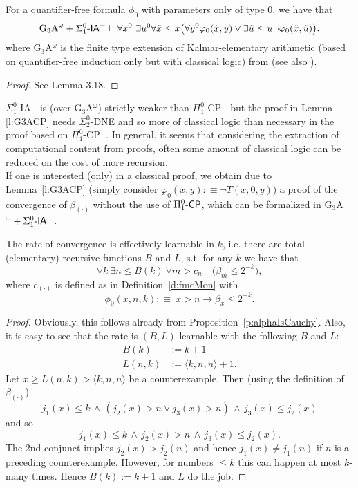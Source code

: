 \begin{lemma}\label{l:G3ACP} 
For a quantifier-free formula $\phi_0$ with parameters only of type $0$, we have that
\[
\mbox{\rm G$_3$A}^\omega + 
\Sigma^0_1\textsf{\upshape -}\textsf{\upshape IA}^- \vdash 
\forall x^0\ \exists u^0 
\forall\tilde x\leq x \big(  
\forall y^0 \varphi_0(\tilde x,y)
\vee\exists\tilde u\leq u\neg\varphi_0(\tilde x,\tilde u) \big).
\]
where {\rm G$_3$A$^{\omega}$} is the finite type extension of Kalmar-elementary 
arithmetic (based on quantifier-free induction only but with classical logic) 
from 
{\rm \cite{Kohlenbach(lowrate)}} (see also {\rm \cite{Kohlenbach08}}).
\end{lemma}
\begin{proof}
See \cite{Kohlenbach08} Lemma 3.18.
\end{proof}

\begin{rmk}
$\Sigma^0_1$-IA$^-$ is (over G$_3$A$^{\omega}$) strictly weaker than 
$\Pi^0_1$-CP$^-$ but the proof in Lemma \ref{l:G3ACP} needs $\Sigma^0_2$-DNE 
and so more of classical logic than necessary in the proof based on 
$\Pi^0_1$-CP$^-$.
In general, it seems that considering the extraction of computational content 
from proofs, often some amount of classical logic can be reduced on the cost of more recursion.\\
If one is interested (only) in a classical proof, we obtain due to Lemma~\ref{l:G3ACP}
(simply consider $\varphi_0(x,y):\equiv \neg T(x,0,y)$) a proof of the 
convergence of $\beta_{(\cdot)}$ 
without the use of $\Pi^0_1\textsf{\upshape -}\textsf{\upshape CP}$, which can be formalized in G$_3$A$^{\omega}+\Sigma^0_1\textsf{\upshape -}\textsf{\upshape IA}^-$.
\end{rmk}

\begin{prop}\label{p:alphaIsLearnable}
The rate of convergence is effectively learnable in $k$, i.e.
there are total (elementary) 
recursive functions $B$ and $L$, s.t. for any $k$ we have that
\[ \forall k\ \exists n\leq B(k)\ \forall m > c_n\quad \big(\beta_m\leq 2^{-k}\big),\]
where $c_{(\cdot)}$ is defined as in Definition~\ref{d:fmcMon} with
\[
\phi_0(x,n,k):\equiv\ x> n\rightarrow \beta_x\le 2^{-k}.
\]
\end{prop}
\begin{proof}
Obviously, this follows already from Proposition~\ref{p:alphaIsCauchy}. Also, it is easy to see that the 
rate is $(B,L)$-learnable with the following $B$ and $L$:
\begin{align*}
B(k)&:=k+1  \\
L(n,k)&:= \langle k,n,n \rangle+1.
\end{align*}
Let $x\ge L(n,k)>\langle k,n,n\rangle$ be a counterexample. Then (using 
the definition of $\beta_{(\cdot)}$)  
\[ j_1(x)\le k\,\wedge\,(j_2(x)>n\vee j_3(x)>n)\,\wedge \,j_3(x)\le j_2(x) \] 
and so 
\[ j_1(x)\le k\,\wedge\,j_2(x)>n\,\wedge\,j_3(x)\le j_2(x). \]
The 2nd conjunct implies $j_2(x)>j_2(n)$ and hence $j_1(x)\not= j_1(n)$ 
if $n$ is a preceding counterexample. However, for numbers $\le k$ this can 
happen at most $k$-many times. Hence $B(k):=k+1$ and $L$ do the job.
\end{proof}


